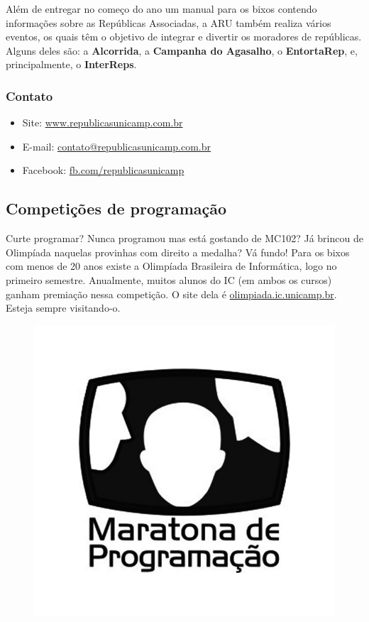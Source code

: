Além de entregar no começo do ano um manual para os bixos contendo informações
sobre as Repúblicas Associadas, a ARU também realiza vários eventos, os quais
têm o objetivo de integrar e divertir os moradores de repúblicas. Alguns deles
são: a \textbf{Alcorrida}, a \textbf{Campanha do Agasalho},
o \textbf{EntortaRep}, e, principalmente, o \textbf{InterReps}.

\subsubsection{Contato}

\begin{itemize}
    \item Site: \url{www.republicasunicamp.com.br}
    \item E-mail: \url{contato@republicasunicamp.com.br}
    \item Facebook: \url{fb.com/republicasunicamp}
\end{itemize}

\subsection{Competições de programação}

Curte programar? Nunca programou mas está gostando de MC102? Já brincou de
Olimpíada naquelas provinhas com direito a medalha? Vá fundo! Para os bixos
com menos de 20 anos existe a Olimpíada Brasileira de Informática, logo no primeiro
semestre. Anualmente, muitos alunos do IC (em ambos os cursos) ganham premiação
nessa competição. O site dela é \url{olimpiada.ic.unicamp.br}. Esteja
sempre visitando-o.

\begin{figure}[h!]
    \centering
    \includegraphics[scale=0.30, keepaspectratio=true]{img/imgs/18-grupos_entidades/maratona.jpg}
\end{figure}

